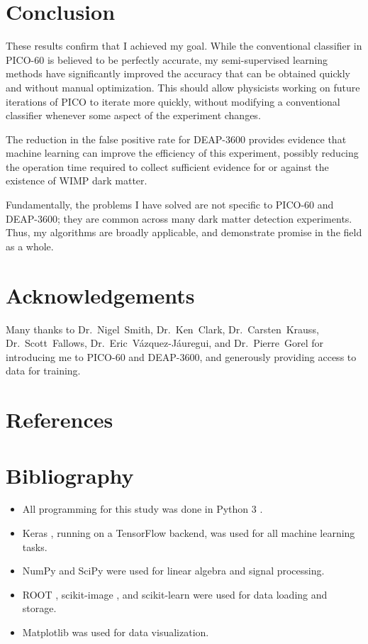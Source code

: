 \documentclass[12pt]{article}
\begin{document}
\section{Conclusion}

These results confirm that I achieved my goal. While the conventional classifier in PICO-60 is believed to be perfectly accurate, my semi-supervised learning methods have significantly improved the accuracy that can be obtained quickly and without manual optimization. This should allow physicists working on future iterations of PICO to iterate more quickly, without modifying a conventional classifier whenever some aspect of the experiment changes.

The reduction in the false positive rate for DEAP-3600 provides evidence that machine learning can improve the efficiency of this experiment, possibly reducing the operation time required to collect sufficient evidence for or against the existence of WIMP dark matter.

Fundamentally, the problems I have solved are not specific to PICO-60 and DEAP-3600; they are common across many dark matter detection experiments. Thus, my algorithms are broadly applicable, and demonstrate promise in the field as a whole.

\section{Acknowledgements}

Many thanks to Dr.~Nigel~Smith, Dr.~Ken~Clark, Dr.~Carsten~Krauss, Dr.~Scott~Fallows, Dr.~Eric~V\'azquez-J\'auregui, and Dr.~Pierre~Gorel for introducing me to PICO-60 and DEAP-3600, and generously providing access to data for training.

\section{References}

\printbibliography[heading=none]

\section{Bibliography}

\begin{itemize}
    \item All programming for this study was done in Python 3 \cite{python}.
    \item Keras \cite{keras}, running on a TensorFlow \cite{tensorflow} backend, was used for all machine learning tasks.
    \item NumPy \cite{numpy} and SciPy \cite{scipy} were used for linear algebra and signal processing.
    \item ROOT \cite{root}, scikit-image \cite{scikit-image}, and scikit-learn \cite{scikit-learn} were used for data loading and storage.
    \item Matplotlib \cite{matplotlib} was used for data visualization.
\end{itemize}
\end{document}
